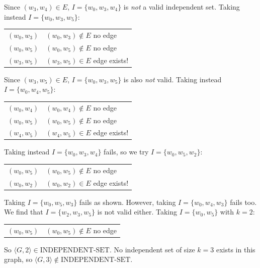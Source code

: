 \documentclass[12pt,a4paper,openany]{article}
\begin{document}
Since $(w_3, w_4) \in E$, $I = \{w_0, w_3, w_4\}$ is \emph{not} a valid independent set. Taking instead $I = \{w_0, w_3, w_5\}$:

\begin{center}
\begin{tabular}{ll}
$(w_0, w_3)$ & $(w_0, w_3) \notin E$ \quad no edge \\
$(w_0, w_5)$ & $(w_0, w_5) \notin E$ \quad no edge \\
$(w_3, w_5)$ & $(w_3, w_5) \in E$ \quad edge exists! \\
\end{tabular}
\end{center}

Since $(w_3, w_5) \in E$, $I = \{w_0, w_3, w_5\}$ is also \emph{not} valid. Taking instead $I = \{w_0, w_4, w_5\}$:

\begin{center}
\begin{tabular}{ll}
$(w_0, w_4)$ & $(w_0, w_4) \notin E$ \quad no edge \\
$(w_0, w_5)$ & $(w_0, w_5) \notin E$ \quad no edge \\
$(w_4, w_5)$ & $(w_4, w_5) \in E$ \quad edge exists! \\
\end{tabular}
\end{center}

Taking instead $I = \{w_0, w_3, w_4\}$ fails, so we try $I = \{w_0, w_5, w_2\}$:

\begin{center}
\begin{tabular}{ll}
$(w_0, w_5)$ & $(w_0, w_5) \notin E$ \quad no edge \\
$(w_0, w_2)$ & $(w_0, w_2) \in E$ \quad edge exists! \\
\end{tabular}
\end{center}

Taking $I = \{w_0, w_5, w_3\}$ fails as shown. However, taking $I = \{w_0, w_4, w_3\}$ fails too. We find that $I = \{w_2, w_3, w_5\}$ is not valid either. Taking $I = \{w_0, w_5\}$ with $k = 2$:

\begin{center}
\begin{tabular}{ll}
$(w_0, w_5)$ & $(w_0, w_5) \notin E$ \quad no edge \\
\end{tabular}
\end{center}

So $\langle G, 2 \rangle \in \text{INDEPENDENT-SET}$. No independent set of size $k = 3$ exists in this graph, so $\langle G, 3 \rangle \notin \text{INDEPENDENT-SET}$.
\end{document}
